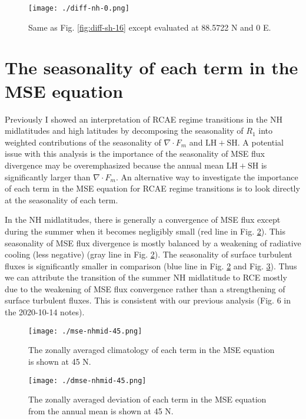 \documentclass[11pt]{article}
\begin{document}
\begin{figure}[htbp]
\centering
\texttt{[image: ./diff-nh-0.png]}
\caption{\label{fig:diff-nh-0}Same as Fig. \ref{fig:diff-sh-16} except evaluated at 88.5722 N and 0 E.}
\end{figure}

\section{The seasonality of each term in the MSE equation}
\label{sec:orgdf69088}
Previously I showed an interpretation of RCAE regime transitions in the NH midlatitudes and high latitudes by decomposing the seasonality of \(R_1\) into weighted contributions of the seasonality of \(\nabla\cdot F_m\) and \(\mathrm{LH+SH}\). A potential issue with this analysis is the importance of the seasonality of MSE flux divergence may be overemphasized because the annual mean \(\mathrm{LH+SH}\) is significantly larger than \(\nabla\cdot F_m\). An alternative way to investigate the importance of each term in the MSE equation for RCAE regime transitions is to look directly at the seasonality of each term.

In the NH midlatitudes, there is generally a convergence of MSE flux except during the summer when it becomes negligibly small (red line in Fig. \ref{fig:mse-nhmid-45}). This seasonality of MSE flux divergence is mostly balanced by a weakening of radiative cooling (less negative) (gray line in Fig. \ref{fig:mse-nhmid-45}). The seasonality of surface turbulent fluxes is significantly smaller in comparison (blue line in Fig. \ref{fig:mse-nhmid-45} and Fig. \ref{fig:dmse-nhmid-45}). Thus we can attribute the transition of the summer NH midlatitude to RCE mostly due to the weakening of MSE flux convergence rather than a strengthening of surface turbulent fluxes. This is consistent with our previous analysis (Fig. 6 in the 2020-10-14 notes).

\begin{figure}[htbp]
\centering
\texttt{[image: ./mse-nhmid-45.png]}
\caption{\label{fig:mse-nhmid-45}The zonally averaged climatology of each term in the MSE equation is shown at 45 N.}
\end{figure}

\begin{figure}[htbp]
\centering
\texttt{[image: ./dmse-nhmid-45.png]}
\caption{\label{fig:dmse-nhmid-45}The zonally averaged deviation of each term in the MSE equation from the annual mean is shown at 45 N.}
\end{figure}
\end{document}
